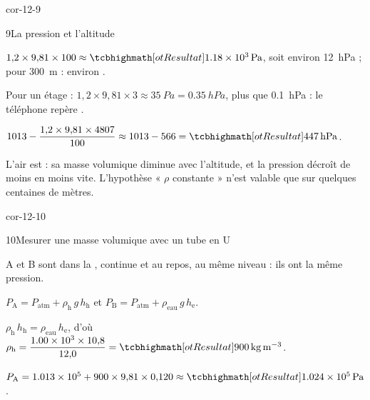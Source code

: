 \begin{blocLivre}{cor-12-9}
\begin{corrige}{9}{La pression et l'altitude}
\begin{questions}
\item $1{,}2\times9{,}81\times100\approx\res{\qty{1,18e3}{Pa}}$, soit environ \qty{12}{hPa} ; pour \qty{300}{m} : environ .
\item Pour un étage : $1{,}2\times9{,}81\times3\approx\qty{35}{Pa}=\qty{0,35}{hPa}$, plus que \qty{0,1}{hPa} : le téléphone repère .
\item $1013-\dfrac{1{,}2\times9{,}81\times4807}{100}\approx1013-566=\res{\qty{447}{hPa}}$.
\item L'air est  : sa masse volumique diminue avec l'altitude, et la pression décroît de moins en moins vite.
L'hypothèse « $\rho$ constante » n'est valable que sur quelques centaines de mètres.
\end{questions}
\end{corrige}
\end{blocLivre}
\begin{blocLivre}{cor-12-10}
\begin{corrige}{10}{Mesurer une masse volumique avec un tube en U}
\begin{questions}
\item A et B sont dans la , continue et au repos, au même niveau : ils ont la même pression.
\item $P_\mathrm{A}=P_\mathrm{atm}+\rho_\mathrm{h}\,g\,h_\mathrm{h}$ et $P_\mathrm{B}=P_\mathrm{atm}+\rho_\mathrm{eau}\,g\,h_\mathrm{e}$.
\item $\rho_\mathrm{h}\,h_\mathrm{h}=\rho_\mathrm{eau}\,h_\mathrm{e}$, d'où $\rho_\mathrm{h}=\dfrac{\num{1,00e3}\times10{,}8}{12{,}0}=\res{\qty{900}{kg.m^{-3}}}$.
\item $P_\mathrm{A}=\num{1,013e5}+900\times9{,}81\times0{,}120\approx\res{\qty{1,024e5}{Pa}}$.
\end{questions}
\end{corrige}
\end{blocLivre}
